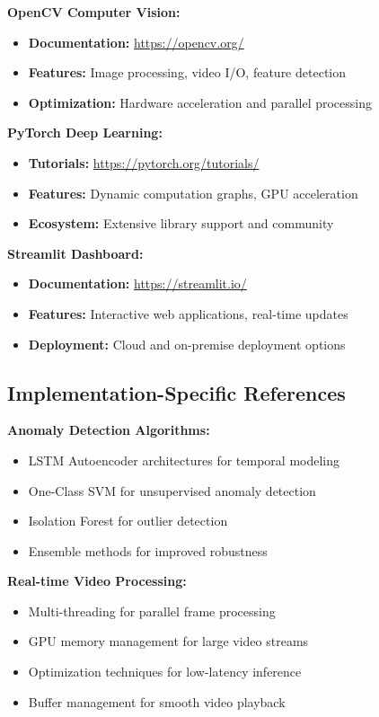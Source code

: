 \documentclass[12pt,a4paper]{article}
\begin{document}
\textbf{OpenCV Computer Vision:}
\begin{itemize}
    \item \textbf{Documentation:} \url{https://opencv.org/}
    \item \textbf{Features:} Image processing, video I/O, feature detection
    \item \textbf{Optimization:} Hardware acceleration and parallel processing
\end{itemize}

\textbf{PyTorch Deep Learning:}
\begin{itemize}
    \item \textbf{Tutorials:} \url{https://pytorch.org/tutorials/}
    \item \textbf{Features:} Dynamic computation graphs, GPU acceleration
    \item \textbf{Ecosystem:} Extensive library support and community
\end{itemize}

\textbf{Streamlit Dashboard:}
\begin{itemize}
    \item \textbf{Documentation:} \url{https://streamlit.io/}
    \item \textbf{Features:} Interactive web applications, real-time updates
    \item \textbf{Deployment:} Cloud and on-premise deployment options
\end{itemize}

\subsection{Implementation-Specific References}

\textbf{Anomaly Detection Algorithms:}
\begin{itemize}
    \item LSTM Autoencoder architectures for temporal modeling
    \item One-Class SVM for unsupervised anomaly detection
    \item Isolation Forest for outlier detection
    \item Ensemble methods for improved robustness
\end{itemize}

\textbf{Real-time Video Processing:}
\begin{itemize}
    \item Multi-threading for parallel frame processing
    \item GPU memory management for large video streams
    \item Optimization techniques for low-latency inference
    \item Buffer management for smooth video playback
\end{itemize}
\end{document}
